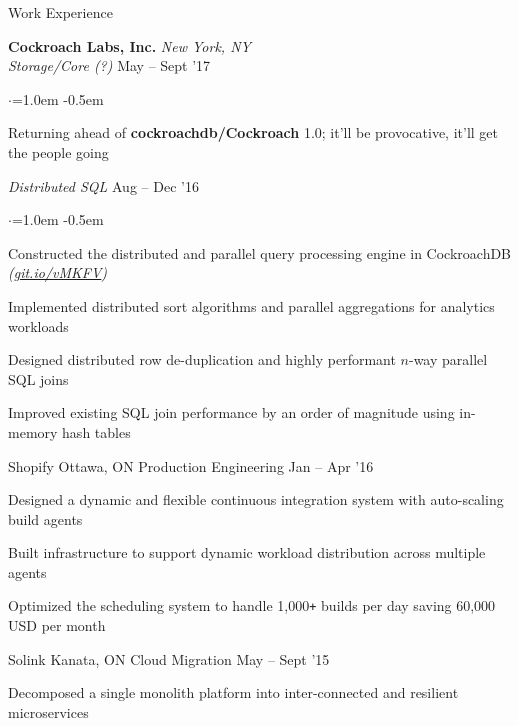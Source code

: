 \documentclass{resume} %
\begin{document}
\begin{rSection}{Work Experience}


  {\bf Cockroach Labs, Inc.}  \hfill  {\em New York, NY}
  \\
  {\em Storage/Core (?)}  \hfill  {May -- Sept '17}
  \smallskip
  \begin{list}{$\cdot$}{\leftmargin=1.0em}
  \itemsep -0.5em \vspace{-0.5em}
  \item Returning ahead of \textbf {cockroachdb/Cockroach} 1.0; it'll be provocative, it'll get the people going
  \end{list}
  {\em Distributed SQL}  \hfill  {Aug -- Dec '16}
  \smallskip
  \begin{list}{$\cdot$}{\leftmargin=1.0em}
  \itemsep -0.5em \vspace{-0.5em}
    \item Constructed the distributed and parallel query processing engine in
      CockroachDB {\em (\href{https://git.io/vMKFV}{git.io/vMKFV})}
    \item Implemented distributed sort algorithms and parallel aggregations for
      analytics workloads
    \item Designed distributed row de-duplication and highly performant $n$-way
      parallel SQL joins
    \item Improved existing SQL join performance by an order of magnitude using
      in-memory hash tables
  \end{list}
  \vspace{0.5em}

  \begin{rSubsection}{Shopify}
                     {Ottawa, ON}
                     {Production Engineering}
                     {Jan -- Apr '16}

  \item Designed a dynamic and flexible continuous integration system with
    auto-scaling build agents
  \item Built infrastructure to support dynamic workload distribution across
    multiple agents
  \item Optimized the scheduling system to handle 1,000\texttt{+} builds per
    day saving 60,000 USD per month
  \end{rSubsection}

  \begin{rSubsection}{Solink}
                     {Kanata, ON}
                     {Cloud Migration}
                     {May -- Sept '15}

    \item Decomposed a single monolith platform into inter-connected and
      resilient microservices
  \end{rSubsection}
\end{rSection}
\end{document}
